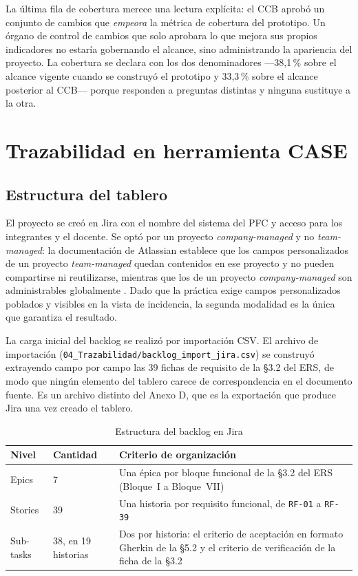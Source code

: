 \documentclass[11pt,letterpaper]{article}
\begin{document}
\noindent
La última fila de cobertura merece una lectura explícita: el CCB aprobó un conjunto de cambios que
\emph{empeora} la métrica de cobertura del prototipo. Un órgano de control de cambios que solo
aprobara lo que mejora sus propios indicadores no estaría gobernando el alcance, sino administrando
la apariencia del proyecto. La cobertura se declara con los dos denominadores ---38,1\,\% sobre el
alcance vigente cuando se construyó el prototipo y 33,3\,\% sobre el alcance posterior al CCB---
porque responden a preguntas distintas y ninguna sustituye a la otra.

\section{Trazabilidad en herramienta CASE}
\label{sec:trazabilidad}

\subsection{Estructura del tablero}

El proyecto se creó en Jira con el nombre del sistema del PFC y acceso para los integrantes y el
docente. Se optó por un proyecto \emph{company-managed} y no \emph{team-managed}: la documentación
de Atlassian establece que los campos personalizados de un proyecto \emph{team-managed} quedan
contenidos en ese proyecto y no pueden compartirse ni reutilizarse, mientras que los de un proyecto
\emph{company-managed} son administrables globalmente \cite{atlassianfields}. Dado que la práctica
exige campos personalizados poblados y visibles en la vista de incidencia, la segunda modalidad es
la única que garantiza el resultado.

La carga inicial del backlog se realizó por importación CSV. El archivo de importación
(\texttt{04\_Trazabilidad/backlog\_import\_jira.csv}) se construyó extrayendo campo por campo las 39
fichas de requisito de la \S3.2 del ERS, de modo que ningún elemento del tablero carece de
correspondencia en el documento fuente. Es un archivo distinto del Anexo D, que es la exportación
que produce Jira una vez creado el tablero.

\begin{table}[H]
\centering
\caption{Estructura del backlog en Jira}
\begin{tabular}{L{3.5cm} L{3cm} L{6.5cm}}
\toprule
\textbf{Nivel} & \textbf{Cantidad} & \textbf{Criterio de organización}\\
\midrule
Epics & 7 & Una épica por bloque funcional de la \S3.2 del ERS (Bloque~I a Bloque~VII)\\
Stories & 39 & Una historia por requisito funcional, de \texttt{RF-01} a \texttt{RF-39}\\
Sub-tasks & 38, en 19 historias & Dos por historia: el criterio de aceptación en formato Gherkin de la \S5.2 y el criterio de verificación de la ficha de la \S3.2\\
\bottomrule
\end{tabular}
\end{table}
\end{document}
